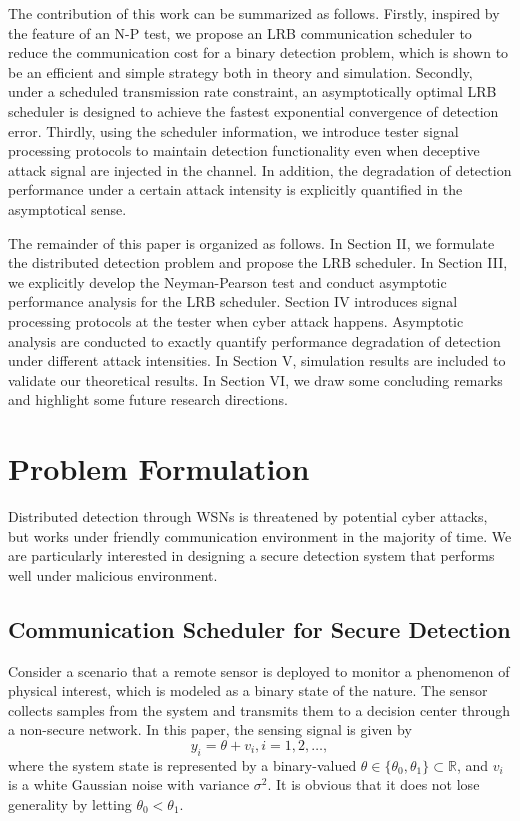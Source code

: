 \documentclass[journal]{IEEEtran}
\def\bR{\mathbb{R}}
\begin{document}
The contribution of this work can be summarized as follows. Firstly, inspired by the feature of an N-P test, we propose an LRB communication scheduler to reduce the communication cost for a binary detection problem, which is shown to be an efficient and simple strategy both in theory and simulation.
Secondly, under a scheduled transmission rate constraint, an asymptotically optimal LRB scheduler is designed to achieve the fastest exponential convergence of detection error.
Thirdly, using the scheduler information, we introduce tester signal processing protocols to maintain detection functionality even when deceptive attack signal are injected in the channel. In addition, the degradation of detection performance under a certain attack intensity is explicitly quantified in the asymptotical sense.



The remainder of this paper is organized as follows. In Section II, we formulate the distributed detection problem and propose the LRB scheduler. In Section III, we explicitly develop the Neyman-Pearson test and conduct asymptotic performance analysis for the LRB scheduler. Section IV introduces signal processing protocols at the tester when cyber attack happens. Asymptotic analysis are conducted to exactly quantify performance degradation of detection under different attack intensities. In Section V, simulation results are included to validate our theoretical results. In Section VI, we draw some concluding remarks and highlight some future research directions.



\section{Problem Formulation}
Distributed detection through WSNs is threatened by potential cyber attacks, but works under friendly communication environment in the majority of time. We are particularly interested in designing a secure detection system that performs well under malicious environment.



\label{section2}
\subsection{Communication Scheduler for Secure Detection}
Consider a scenario that a remote sensor is deployed to monitor a phenomenon of physical interest, which is modeled as a binary state of the nature. The  sensor collects samples from the system and transmits them to a decision center through a non-secure network. In this paper,  the sensing signal is given by
\begin{equation}
y_{i}=\theta+v_{i},i=1,2,\ldots, \label{system}
\end{equation}
where the system state is represented by a binary-valued $\theta\in \{\theta_0, \theta_1\}\subset\bR$, and $v_{i}$ is a white Gaussian noise with variance $\sigma^2$.
It is obvious that it does not lose generality by letting $\theta_{0}<\theta_{1}$.
\end{document}
